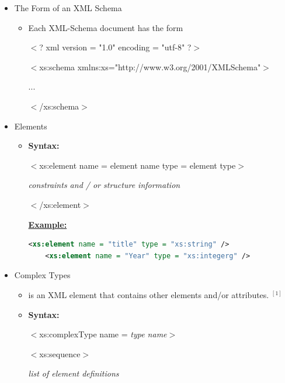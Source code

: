 \documentclass[12pt]{article}
\begin{document}
\begin{enumerate}[1.]
\begin{itemize}
        \item The Form of an XML Schema
        \begin{itemize}
            \item Each XML-Schema document has the form

            \bigskip

            $<$? xml version = "1.0" encoding = "utf-8" ?$>$

            $<$xs:schema xmlns:xs="http://www.w3.org/2001/XMLSchema"$>$

            \quad...

            $<$/xs:schema$>$

        \end{itemize}
        \item Elements
        \begin{itemize}
            \item \textbf{Syntax:}

            \bigskip

            $<$xs:element name = element name type = element type$>$

            \quad\textit{constraints and / or structure information}

            $<$/xs:element$>$


        \bigskip

        \underline{\textbf{Example:}}

        \bigskip

    \begin{lstlisting}[language=XML]
    <xs:element name = "title" type = "xs:string" />
    <xs:element name = "Year" type = "xs:integerg" />

    \end{lstlisting}

        \end{itemize}

        \item Complex Types
        \begin{itemize}
            \item is an XML element that contains other elements and/or attributes. $^{[1]}$
            \item \textbf{Syntax:}

            \bigskip

            $<$xs:complexType name = \textit{type name}$>$

            \quad$<$xs:sequence$>$

            \quad\quad\textit{list of element definitions}


\end{itemize}
\end{itemize}
\end{enumerate}
\end{document}
